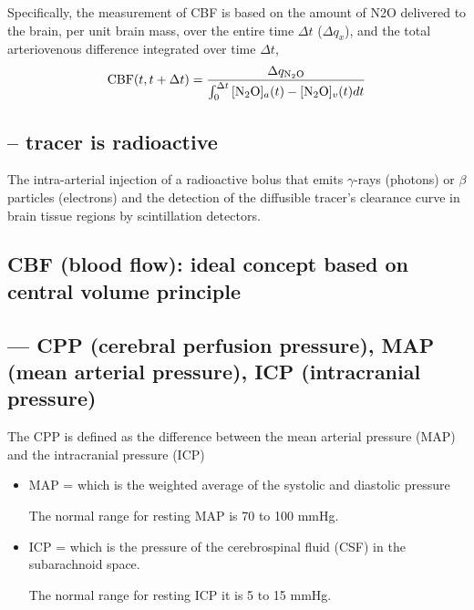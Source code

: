 Specifically, the measurement of CBF is based on the amount of N2O delivered to
the brain, per unit brain mass, over the entire time $\Delta t$ ($\Delta q_x$),
and the total arteriovenous difference integrated over time $\Delta t$, 
\begin{equation}
\text{CBF}(t, t+\Delta t) = \frac{\Delta q_{\ce{N2O}}}{ \int_0^{\Delta t} { [{\ce{N2O}}]_a(t) -
[{\ce{N2O}}]_v(t)} dt }
\end{equation}

\subsection{-- tracer is radioactive}

The intra-arterial injection of a radioactive bolus that emits $\gamma$-rays
(photons) or $\beta$ particles (electrons) and the detection of the diffusible
tracer's clearance curve in brain tissue regions by scintillation detectors.






\subsection{CBF (blood flow): ideal concept based on central volume
principle}



\subsection{--- CPP (cerebral perfusion pressure), MAP (mean arterial
pressure), ICP (intracranial pressure)}
\label{sec:CPP}
\label{sec:MAP-mean-arterial-pressure}
\label{sec:ICP}

The CPP is defined as the difference between the mean arterial pressure (MAP)
and the intracranial pressure (ICP)
\begin{itemize}
  \item MAP = which is the weighted average of the systolic and diastolic pressure

The normal range for resting MAP is 70 to 100 mmHg.
  
  \item ICP =  which is the pressure of the cerebrospinal fluid (CSF) in the
  subarachnoid space.

The normal range for resting ICP it is 5 to 15 mmHg.

\end{itemize}

